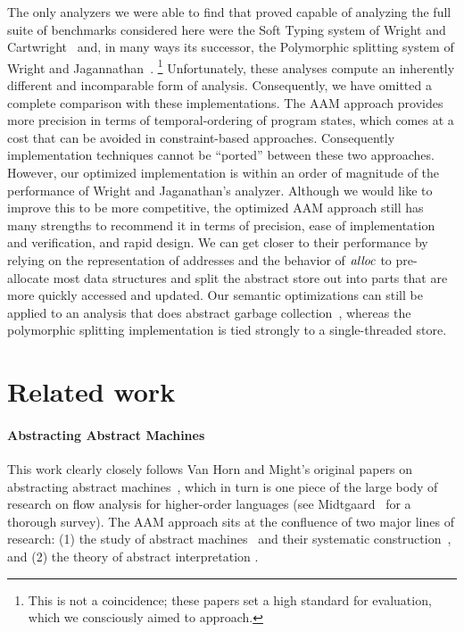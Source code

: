\documentclass[9pt]{sigplanconf} %
\begin{document}
The only analyzers we were able to find that proved capable of
analyzing the full suite of benchmarks considered here were the Soft
Typing system of Wright and
Cartwright~\cite{dvanhorn:Wright1997Practical} and, in many ways its
successor, the Polymorphic splitting system of Wright and
Jagannathan~\cite{dvanhorn:wright-jagannathan-toplas98}.
%
\footnote{This is not a coincidence; these papers set a high standard for evaluation, which we consciously aimed to approach.}
%
Unfortunately, these analyses compute an inherently different and incomparable form of analysis.
%
Consequently, we have omitted a complete comparison with these implementations.
%
The AAM approach provides more precision in terms of temporal-ordering of program states, which comes at a cost that can be avoided in constraint-based approaches.
%
Consequently implementation techniques cannot be ``ported'' between these two approaches.
%
  However, our optimized implementation is within an order of magnitude of the performance of Wright and Jaganathan's analyzer.
%
Although we would like to improve this to be more competitive, the optimized AAM approach still has many strengths to recommend it in terms of precision, ease of implementation and verification, and rapid design.
%
 We can get closer to their performance by relying on the representation of addresses and the behavior of $\mathit{alloc}$ to pre-allocate most data structures and split the abstract store out into parts that are more quickly accessed and updated.
%
Our semantic optimizations can still be applied to an analysis that does abstract garbage collection~\cite{dvanhorn:Might:2006:GammaCFA}, whereas the polymorphic splitting implementation is tied strongly to a single-threaded store.

\section{Related work}
\label{sec:related}

\paragraph{Abstracting Abstract Machines}

This work clearly closely follows Van Horn and Might's original papers on abstracting abstract machines~\cite{dvanhorn:VanHorn2011Abstracting,dvanhorn:VanHorn2012Systematic}, which in turn is one piece of the large body of research on flow analysis for higher-order languages (see Midtgaard~\cite{dvanhorn:Midtgaard2011Controlflow} for a thorough survey).
%
The AAM approach sits at the confluence of two major lines of research:
%
(1) the study of abstract machines~\cite{dvanhorn:landin-64} and their systematic construction~\cite{dvanhorn:reynolds-hosc98},
%
and (2) the theory of abstract interpretation \cite{dvanhorn:Cousot:1977:AI,dvanhorn:Cousot1979Systematic}.
\end{document}
